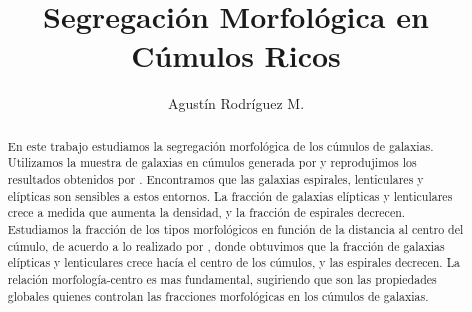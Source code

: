 \documentclass[a4paper,10pt]{article}
\title{Segregaci\'on Morfol\'ogica en C\'umulos Ricos}
\author{Agustín Rodríguez M.}
\def\aj {AJ}
\def\mnras {MNRAS}
\begin{document}
\maketitle

\begin{abstract}

En este trabajo estudiamos la segregaci\'on morfol\'ogica de los c\'umulos de galaxias. Utilizamos la muestra de galaxias en c\'umulos generada por \citet{Dressler1980.catalogo} y reprodujimos los resultados obtenidos por \citet{Dressler1980}. Encontramos que las galaxias espirales, lenticulares y el\'ipticas son sensibles a estos entornos. La fracci\'on de galaxias el\'ipticas y lenticulares crece a medida que aumenta la densidad, y la fracci\'on de espirales decrecen.
Estudiamos la fracci\'on de los tipos morfol\'ogicos en funci\'on de la distancia al centro del c\'umulo, de acuerdo a lo realizado por \citet{Whitmore1993}, donde obtuvimos que la fracci\'on de galaxias el\'ipticas y lenticulares crece hac\'ia el centro de los c\'umulos, y las espirales decrecen. La relaci\'on morfología-centro es mas fundamental, sugiriendo que son las propiedades globales quienes controlan las fracciones morfol\'ogicas en los c\'umulos de galaxias.
\end{abstract}

\citep{Correa2019}
\citep{Springel2001}
\citep{Ruiz2015}
\citep{EAGLE}
\citep{Paillas2017}
\citep{Pisani2015}
\citep{Cai2014}
\citep{Massara2015}
\citep{Hopkins2015}

























\end{document}
